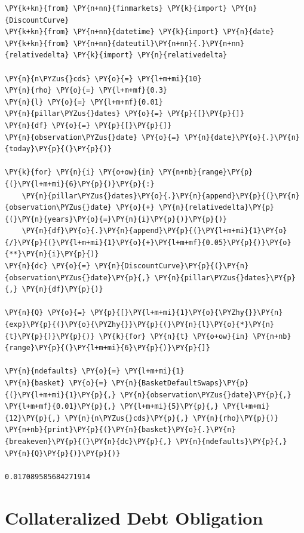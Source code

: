 \begin{tcolorbox}[breakable, size=fbox, boxrule=1pt, pad at break*=1mm,colback=cellbackground, colframe=cellborder]
\begin{Verbatim}[commandchars=\\\{\}]
\PY{k+kn}{from} \PY{n+nn}{finmarkets} \PY{k}{import} \PY{n}{DiscountCurve}
\PY{k+kn}{from} \PY{n+nn}{datetime} \PY{k}{import} \PY{n}{date}
\PY{k+kn}{from} \PY{n+nn}{dateutil}\PY{n+nn}{.}\PY{n+nn}{relativedelta} \PY{k}{import} \PY{n}{relativedelta}
		
\PY{n}{n\PYZus{}cds} \PY{o}{=} \PY{l+m+mi}{10}
\PY{n}{rho} \PY{o}{=} \PY{l+m+mf}{0.3}
\PY{n}{l} \PY{o}{=} \PY{l+m+mf}{0.01}
\PY{n}{pillar\PYZus{}dates} \PY{o}{=} \PY{p}{[}\PY{p}{]}
\PY{n}{df} \PY{o}{=} \PY{p}{[}\PY{p}{]}
\PY{n}{observation\PYZus{}date} \PY{o}{=} \PY{n}{date}\PY{o}{.}\PY{n}{today}\PY{p}{(}\PY{p}{)}
		
\PY{k}{for} \PY{n}{i} \PY{o+ow}{in} \PY{n+nb}{range}\PY{p}{(}\PY{l+m+mi}{6}\PY{p}{)}\PY{p}{:}
    \PY{n}{pillar\PYZus{}dates}\PY{o}{.}\PY{n}{append}\PY{p}{(}\PY{n}{observation\PYZus{}date} \PY{o}{+} \PY{n}{relativedelta}\PY{p}{(}\PY{n}{years}\PY{o}{=}\PY{n}{i}\PY{p}{)}\PY{p}{)}
    \PY{n}{df}\PY{o}{.}\PY{n}{append}\PY{p}{(}\PY{l+m+mi}{1}\PY{o}{/}\PY{p}{(}\PY{l+m+mi}{1}\PY{o}{+}\PY{l+m+mf}{0.05}\PY{p}{)}\PY{o}{**}\PY{n}{i}\PY{p}{)}
\PY{n}{dc} \PY{o}{=} \PY{n}{DiscountCurve}\PY{p}{(}\PY{n}{observation\PYZus{}date}\PY{p}{,} \PY{n}{pillar\PYZus{}dates}\PY{p}{,} \PY{n}{df}\PY{p}{)}
		
\PY{n}{Q} \PY{o}{=} \PY{p}{[}\PY{l+m+mi}{1}\PY{o}{\PYZhy{}}\PY{n}{exp}\PY{p}{(}\PY{o}{\PYZhy{}}\PY{p}{(}\PY{n}{l}\PY{o}{*}\PY{n}{t}\PY{p}{)}\PY{p}{)} \PY{k}{for} \PY{n}{t} \PY{o+ow}{in} \PY{n+nb}{range}\PY{p}{(}\PY{l+m+mi}{6}\PY{p}{)}\PY{p}{]}
		
\PY{n}{ndefaults} \PY{o}{=} \PY{l+m+mi}{1}
\PY{n}{basket} \PY{o}{=} \PY{n}{BasketDefaultSwaps}\PY{p}{(}\PY{l+m+mi}{1}\PY{p}{,} \PY{n}{observation\PYZus{}date}\PY{p}{,} \PY{l+m+mf}{0.01}\PY{p}{,} \PY{l+m+mi}{5}\PY{p}{,} \PY{l+m+mi}{12}\PY{p}{,} \PY{n}{n\PYZus{}cds}\PY{p}{,} \PY{n}{rho}\PY{p}{)}
\PY{n+nb}{print}\PY{p}{(}\PY{n}{basket}\PY{o}{.}\PY{n}{breakeven}\PY{p}{(}\PY{n}{dc}\PY{p}{,} \PY{n}{ndefaults}\PY{p}{,} \PY{n}{Q}\PY{p}{)}\PY{p}{)}

0.017089585684271914
\end{Verbatim}
\end{tcolorbox}


\section{Collateralized Debt Obligation}\label{collateralized-debt-obligation}


